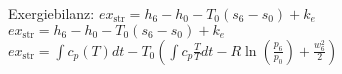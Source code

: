 Exergiebilanz:  
\( ex_{\text{str}} = h_6 - h_0 - T_0 \left( s_6 - s_0 \right) + k_e \)  
\( ex_{\text{str}} = h_6 - h_0 - T_0 \left( s_6 - s_0 \right) + k_e \)  
\( ex_{\text{str}} = \int c_p \left( T \right) dt - T_0 \left( \int c_p \frac{T}{T} dt - R \ln \left( \frac{p_6}{p_0} \right) + \frac{w_6^2}{2} \right) \)